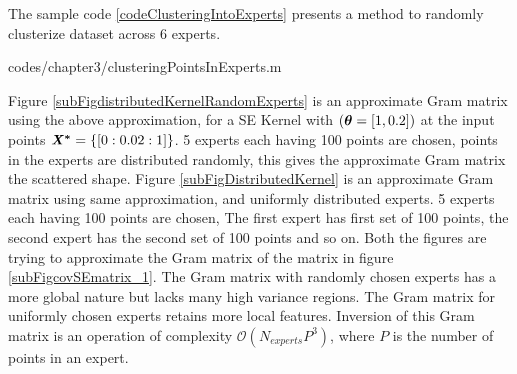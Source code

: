 The sample code \ref{codeClusteringIntoExperts} presents a method to randomly clusterize dataset across $6$ experts.
\begin{mdframed}[hidealllines=true,backgroundcolor=lightgray!20]

                    {codes/chapter3/clusteringPointsInExperts.m}
\end{mdframed}

Figure \ref{subFigdistributedKernelRandomExperts} is an approximate Gram matrix using the above approximation, for a SE Kernel with $(\boldsymbol{\theta} = [1, 0.2])$ at the input points $\bm{\mathit{X^{*}}} = \{[0:0.02:1]\}$. 5 experts each having 100 points are chosen, points in the experts are distributed randomly, this gives the approximate Gram matrix the scattered shape. Figure \ref{subFigDistributedKernel} is an approximate Gram matrix using same approximation, and uniformly distributed experts. 5 experts each having 100 points are chosen, The first expert has first set of 100 points, the second expert has the second set of 100 points and so on. Both the figures are trying to approximate the Gram matrix of the matrix in figure \ref{subFigcovSEmatrix_1}. The Gram matrix with randomly chosen experts has a more global nature but lacks many high variance regions. The Gram matrix for uniformly chosen experts retains more local features. Inversion of this Gram matrix is an operation of complexity $\mathcal{O}(N_{experts}P^{3})$, where $P$ is the number of points in an expert.

